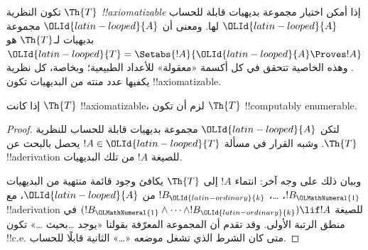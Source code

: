 \documentclass[../../../include/open-logic-section]{subfiles}
\begin{document}


تكون النظرية $\Th{T}$ \emph{!!{axiomatizable}} إذا أمكن اختيار
مجموعة بديهيات قابلة للحساب ${\OLId{latin-looped}{A}}$ لها. ومعنى أن ${\OLId{latin-looped}{A}}$ مجموعة بديهيات
لـ$\Th{T}$ هو ${\OLId{latin-looped}{T}}=\Setabs{!A}{{\OLId{latin-looped}{A}}\Proves !A}$. وهذه الخاصية تتحقق في
كل أكسمة «معقولة» للأعداد الطبيعية؛ وبخاصة، كل نظرية يكفيها عدد
منته من البديهيات تكون !!{axiomatizable}.

\begin{lem}
إذا كانت $\Th{T}$ !!{axiomatizable}، لزم أن تكون $\Th{T}$
!!{computably
enumerable}.
\end{lem}

\begin{proof}
لتكن ${\OLId{latin-looped}{A}}$ مجموعة بديهيات قابلة للحساب للنظرية $\Th{T}$. وشبه القرار
في مسألة $!A\in {\OLId{latin-looped}{T}}$ يحصل بالبحث عن !!a{derivation} للصيغة $!A$
من تلك البديهيات.

وبيان ذلك على وجه آخر: انتماء $!A$ إلى $\Th{T}$ يكافئ وجود قائمة
منتهية من البديهيات $!B_{\OLMathNumeral{1}}$، \dots، $!B_{\OLId{latin-ordinary}{k}}$ من ${\OLId{latin-looped}{A}}$، مع
!!a{derivation} للصيغة
$(!B_{\OLMathNumeral{1}}\land\dots\land !B_{\OLId{latin-ordinary}{k}})\lif !A$ في منطق الرتبة الأولى.
وقد تقدم أن المجموعة المعرّفة بقولنا «يوجد \dots بحيث \dots»
تكون !!{c.e.} متى كان الشرط الذي تشغل موضعه «\dots» الثانية قابلًا
للحساب.
\end{proof}
\end{document}
